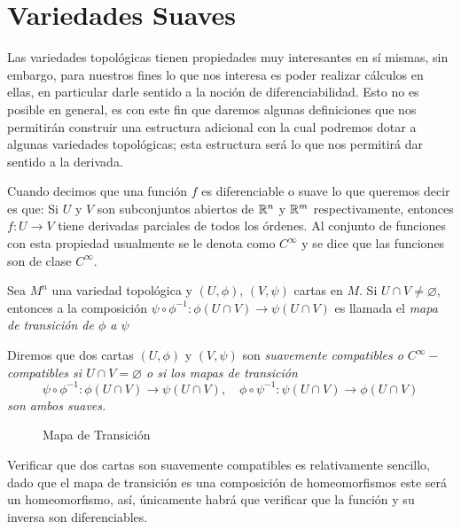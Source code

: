 \section{Variedades Suaves}\label{Sección: Variedades Suaves}
Las variedades topológicas tienen propiedades muy interesantes en sí mismas, sin embargo, para nuestros fines lo que nos interesa es poder realizar cálculos en ellas, en particular darle sentido a la noción de diferenciabilidad. Esto no es posible en general, es con este fin que daremos algunas definiciones que nos permitirán construir una estructura adicional con la cual podremos dotar a algunas variedades topológicas; esta estructura será lo que nos permitirá dar sentido a la derivada.

Cuando decimos que una función $f$ es diferenciable o suave lo que queremos decir es que: Si $U$ y $V$ son subconjuntos abiertos de $\mathbb{R}^n$ y $\mathbb{R}^m$ respectivamente, entonces  $f: U \to V$ tiene derivadas parciales de todos los órdenes. Al conjunto de funciones con esta propiedad usualmente se le denota como $C^{\infty}$ y se dice que las funciones son de clase $C^{\infty}$.


\begin{definition}\label{Definición: Mapa de Transición}
	Sea $M^n$ una variedad topológica y $(U,\phi)$, $(V,\psi)$ cartas en $M$. Si $U \cap V \neq \varnothing$, entonces a la composición $\psi \circ \phi^{-1}: \phi(U \cap V) \to \psi(U \cap V)$ es llamada el \it{mapa de transición de $\phi$ a $\psi$}
\end{definition}

\begin{definition}\label{Definición: Cartas Suavemente Compatibles}
	Diremos que dos cartas $(U,\phi)$ y $(V,\psi)$ son \it{suavemente compatibles} o $C^{\infty}-$compatibles si $U \cap V = \varnothing$ o si los mapas de transición
	\[ \psi \circ \phi^{-1}: \phi(U \cap V) \to \psi(U \cap V), \quad \phi \circ \psi^{-1}: \psi(U \cap V) \to \phi(U \cap V) \]
	son ambos suaves.
\end{definition}

\begin{figure}[h]
	\centering
	
	\caption{Mapa de Transición}
\end{figure}

Verificar que dos cartas son suavemente compatibles es relativamente sencillo, dado que el mapa de transición es una composición de homeomorfismos este será un homeomorfismo, así, únicamente habrá que verificar que la función y su inversa son diferenciables.

